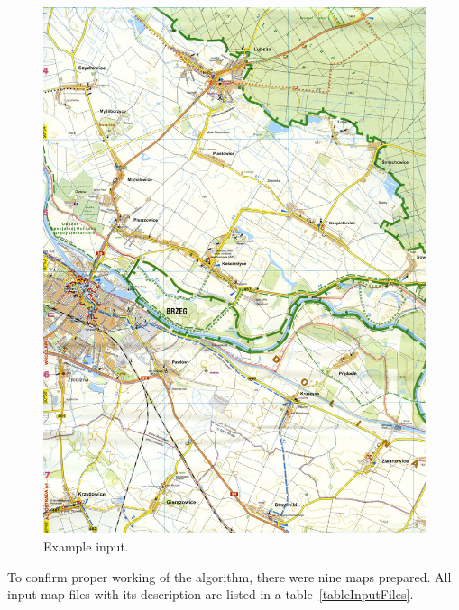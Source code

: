\documentclass[a4paper,onecolumn,oneside,12pt]{memoir}
\begin{document}
\begin{figure}[!ht]
\begin{center}
\includegraphics[scale=0.78]{images/brzeg.jpg}
\caption{Example input.}
\label{inputExample}
\end{center}
\end{figure}

To confirm proper working of the algorithm, there were nine maps prepared. All input map files
with its description are listed in a table~\ref{tableInputFiles}. 
\end{document}
